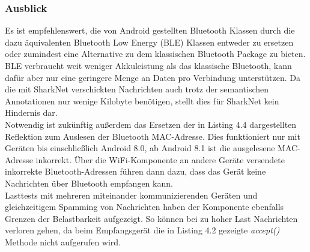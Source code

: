 \subsubsection{Ausblick}
Es ist empfehlenswert, die von Android gestellten Bluetooth Klassen durch die dazu äquivalenten Bluetooth Low Energy (BLE) Klassen entweder zu ersetzen oder zumindest eine Alternative zu dem klassischen Bluetooth Package zu bieten. BLE verbraucht weit weniger Akkuleistung als das klassische Bluetooth, kann dafür aber nur eine geringere Menge an Daten pro Verbindung unterstützen. Da die mit SharkNet verschickten Nachrichten auch trotz der semantischen Annotationen nur wenige Kilobyte benötigen, stellt dies für SharkNet kein Hindernis dar.
\\Notwendig ist zukünftig außerdem das Ersetzen der in Listing 4.4 dargestellten Reflektion zum Auslesen der Bluetooth MAC-Adresse. Dies funktioniert nur mit Geräten bis einschließlich Android 8.0, ab Android 8.1 ist die ausgelesene MAC-Adresse inkorrekt. Über die WiFi-Komponente an andere Geräte versendete inkorrekte Bluetooth-Adressen führen dann dazu, dass das Gerät keine Nachrichten über Bluetooth empfangen kann. 
\\Lasttests mit mehreren miteinander kommunizierenden Geräten und gleichzeitigem Spamming von Nachrichten haben der Komponente ebenfalls Grenzen der Belastbarkeit aufgezeigt. So können bei zu hoher Last Nachrichten verloren gehen, da beim Empfangsgerät die in Listing 4.2 gezeigte \textit{accept()} Methode nicht aufgerufen wird. 
\newpage

